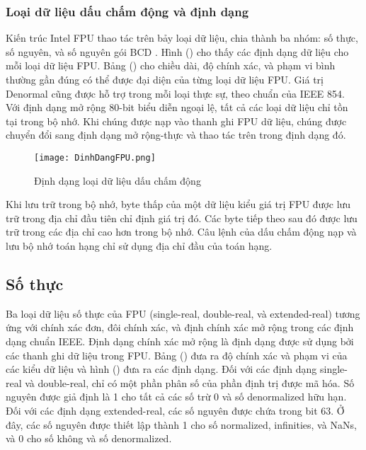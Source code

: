 		\subsubsection{Loại dữ liệu dấu chấm động và định dạng}
		Kiến trúc Intel FPU thao tác trên bảy loại dữ liệu, chia thành ba nhóm: số thực, số nguyên, và số nguyên gói BCD . Hình () cho thấy các định dạng dữ liệu cho mỗi loại dữ liệu FPU. Bảng () cho chiều dài, độ chính xác, và phạm vi bình thường gần đúng có thể được đại diện của từng loại dữ liệu FPU. Giá trị Denormal cũng được hỗ trợ trong mỗi loại thực sự, theo chuẩn của IEEE 854.\\
		
	Với định dạng mở rộng 80-bit biểu diễn ngoại lệ, tất cả các loại dữ liệu chỉ tồn tại trong bộ nhớ. Khi chúng được nạp vào thanh ghi FPU dữ liệu, chúng được chuyển đổi sang định dạng mở rộng-thực và thao tác trên trong định dạng đó.
	\begin{center}
			\begin{figure}[htp]
				\begin{center}
					\texttt{[image: DinhDangFPU.png]}
				\end{center}
				\caption{Định dạng loại dữ liệu dấu chấm động}				
				\label{fig:ProtectedFPU16}				
			\end{figure}
		\end{center}	
		
		Khi lưu trữ trong bộ nhớ, byte thấp của một dữ liệu kiểu giá trị FPU được lưu trữ trong địa chỉ đầu tiên chỉ định giá trị đó. Các byte tiếp theo sau đó được lưu trữ trong các địa chỉ cao hơn trong bộ nhớ. Câu lệnh của dấu chấm động nạp và lưu bộ nhớ toán hạng chỉ sử dụng địa chỉ đầu của toán hạng.
		
		\newpage
		\subsection*{Số thực}
		Ba loại dữ liệu số thực của FPU (single-real, double-real, và extended-real) tương ứng với chính xác đơn, đôi chính xác, và định chính xác mở rộng trong các định dạng chuẩn IEEE. Định dạng chính xác mở rộng là định dạng được sử dụng bởi các thanh ghi dữ liệu trong FPU. Bảng () đưa ra độ chính xác và phạm vi của các kiểu dữ liệu và hình () đưa ra các định dạng. Đối với các định dạng single-real và double-real, chỉ có một phần phân số của phần định trị được mã hóa. Số nguyên được giả định là 1 cho tất cả các số trừ 0 và số denormalized hữu hạn. Đối với các định dạng extended-real, các số nguyên được chứa trong bit 63. Ở đây, các số nguyên được thiết lập thành 1 cho số normalized, infinities, và NaNs, và 0 cho số không và số denormalized. \\	 
		

